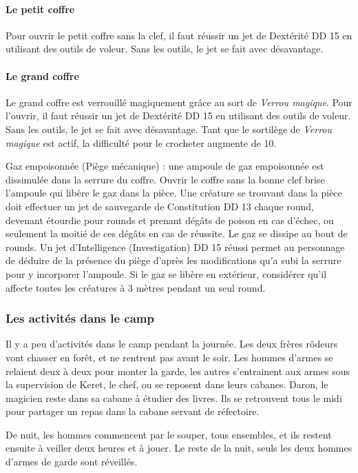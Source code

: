 \documentclass[a4paper,10pt,openany]{book}
\begin{document}
\begin{multicols}{2}
\paragraph{Le petit coffre}
Pour ouvrir le petit coffre sans la clef, il faut réussir un jet de Dextérité DD 15 en utilisant des outils de voleur. Sans les outils, le jet se fait
avec désavantage. 
\paragraph{Le grand coffre}
Le grand coffre est verrouillé magiquement grâce au sort de \emph{Verrou magique}. Pour l'ouvrir, il faut réussir un jet de Dextérité DD 15 en
utilisant des outils de voleur. Sans les outils, le jet se fait avec désavantage. Tant que le sortilège de \emph{Verrou magique} est actif, la
difficulté pour le crocheter augmente de 10.

\begin{quotebox}
	Gaz empoisonnée (Piège mécanique) : une ampoule de gaz empoisonnée est dissimulée dans la serrure du coffre. Ouvrir le coffre sans la bonne clef
	brise l'ampoule qui libère le gaz dans la pièce. Une créature se trouvant dans la pièce doit effectuer un jet de sauvegarde de Constitution DD 13
	chaque round, devenant étourdie pour  rounds et prenant  dégâts de poison en cas d'échec, ou seulement la moitié de ces dégâts en
	cas de réussite. Le gaz se dissipe au bout de  rounds. Un jet d’Intelligence (Investigation) DD 15 réussi permet au personnage de déduire
	de la présence du piège d’après les modifications qu’a subi la serrure pour y incorporer l’ampoule. Si le gaz se libère en extérieur, considérer
	qu'il affecte toutes les créatures à 3 mètres pendant un seul round.
\end{quotebox}

\subsubsection{Les activités dans le camp}
Il y a peu d’activités dans le camp pendant la journée. Les deux frères rôdeurs vont chasser en forêt, et ne rentrent pas avant le soir. Les 
hommes d’armes se relaient deux à deux pour monter la garde, les autres s’entrainent aux armes sous la supervision de Keret, le chef, ou se reposent
dans leurs cabanes. Daron, le magicien reste dans sa cabane à étudier des livres. Ils se retrouvent tous le midi pour partager un repas dans la cabane
servant de réfectoire.\par De nuit, les hommes commencent par le souper, tous ensembles, et ils restent ensuite à veiller deux heures et à jouer. Le
reste de la nuit, seuls les deux hommes d’armes de garde sont réveillés.

\end{multicols}
\end{document}
